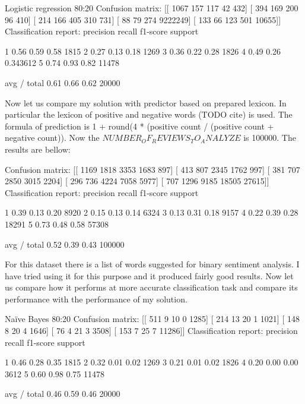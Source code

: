 \documentclass[12pt]{report}
\begin{document}
Logistic regression 80:20
Confusion matrix:
[[ 1067   157   117   42   432]
[  394   169   200   96   410]
[  214   166   405   310  731]
[  88   79   274  9222249]
[ 133   66   123  501 10655]]
Classification report:
precision    recall  f1-score   support

1       0.56      0.59      0.58       1815
2       0.27      0.13      0.18       1269
3       0.36      0.22      0.28       1826
4       0.49      0.26      0.343612
5       0.74      0.93      0.82      11478

avg / total       0.61      0.66      0.62      20000

Now let us compare my solution with predictor based on prepared lexicon. In particular the lexicon of positive and negative words (TODO cite) is used. The formula of prediction is 1 + round(4 * (positive count / (positive count + negative count)). Now the $NUMBER_OF_REVIEWS_TO_ANALYZE$ is 100000. The results are bellow:



Confusion matrix:
[[ 1169  1818  3353  1683   897]
[  413   807  2345  1762   997]
[  381   707  2850  3015  2204]
[  296   736  4224  7058  5977]
[  707  1296  9185 18505 27615]]
Classification report:
precision    recall  f1-score   support

1       0.39      0.13      0.20      8920
2       0.15      0.13      0.14      6324
3       0.13      0.31      0.18      9157
4       0.22      0.39      0.28     18291
5       0.73      0.48      0.58     57308

avg / total       0.52      0.39      0.43    100000


For this dataset there is a list of words suggested for binary sentiment analysis. I have tried using it for this purpose and it produced fairly good results. Now let us compare how it performs at more accurate classification task and compare its performance with the performance of my solution.


Naïve Bayes 80:20
Confusion matrix:
[[  511     9    10     0  1285]
[  214    13    20     1  1021]
[  148     8    20     4  1646]
[   76     4    21     3  3508]
[  153     7    25     7 11286]]
Classification report:
precision    recall  f1-score   support

1       0.46      0.28      0.35      1815
2       0.32      0.01      0.02      1269
3       0.21      0.01      0.02      1826
4       0.20      0.00      0.00      3612
5       0.60      0.98      0.75     11478

avg / total       0.46      0.59      0.46     20000
\end{document}
